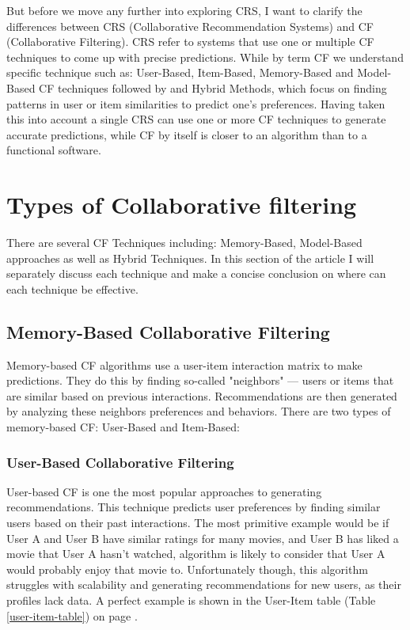 \documentclass[10pt,a4paper]{article}
\begin{document}
\hspace{0.2cm}

But before we move any further into exploring CRS, I want to clarify the differences between CRS (Collaborative Recommendation Systems) and CF (Collaborative Filtering). CRS refer to systems that use one or multiple CF techniques to come up with precise predictions. While by term CF we understand specific technique such as: User-Based, Item-Based, Memory-Based and Model-Based CF techniques followed by and Hybrid Methods, which focus on finding patterns in user or item similarities to predict one's preferences. Having taken this into account a single CRS can use one or more CF techniques to generate accurate predictions, while CF by itself is closer to an algorithm than to a functional software.


\section{Types of Collaborative filtering}
\label{sec:types_of_collaborative_filtering}
There are several CF Techniques including: Memory-Based, Model-Based approaches as well as Hybrid Techniques. In this section of the article I will separately discuss each technique and make a concise conclusion on where can each technique be effective.

\subsection{Memory-Based Collaborative Filtering}
Memory-based CF algorithms use a user-item interaction matrix to make predictions. They do this by finding so-called "neighbors" — users or items that are similar based on previous interactions. Recommendations are then generated by analyzing these neighbors preferences and behaviors. There are two types of memory-based CF: User-Based and Item-Based:

\subsubsection{User-Based Collaborative Filtering}
User-based CF is one the most popular approaches to generating recommendations. This technique predicts user preferences by finding similar users based on their past interactions. The most primitive example would be if User A and User B have similar ratings for many movies, and User B has liked a movie that User A hasn't watched, algorithm is likely to consider that User A would probably enjoy that movie to. Unfortunately though, this algorithm struggles with scalability and generating recommendations for new users, as their profiles lack data. A perfect example is shown in the User-Item table (Table \ref{user-item-table}) on page \pageref{user-item-table}. \cite{8506344} \cite{10.1155/2009/421425}
\end{document}
